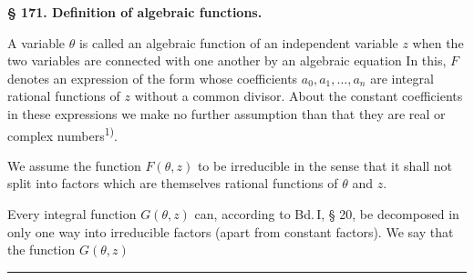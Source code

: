 
\begin{center}
\textbf{§ 171. Definition of algebraic functions.}
\end{center}

A variable $\theta$ is called an algebraic function of an independent
variable $z$ when the two variables are connected with one another by an
algebraic equation
In this, $F$ denotes an expression of the form
whose coefficients $a_0, a_1, \ldots, a_n$ are integral rational functions
of $z$ without a common divisor. About the constant coefficients in these
expressions we make no further assumption than that they are real or
complex numbers\textsuperscript{1)}.

We assume the function $F(\theta,z)$
to be irreducible in the sense that it shall not split into factors which
are themselves rational functions of $\theta$ and $z$.

Every integral
function $G(\theta,z)$ can, according to Bd.\,I, § 20, be decomposed in
only one way into irreducible factors (apart from constant factors). We
say that the function $G(\theta,z)$

\smallskip
\noindent\rule{5em}{0.4pt}


